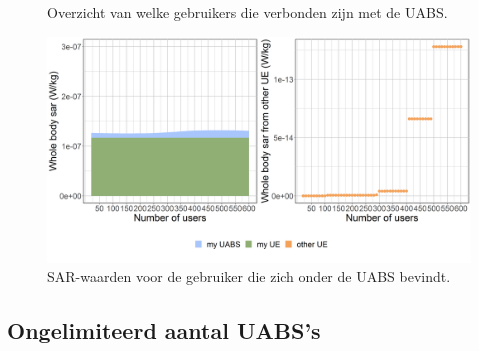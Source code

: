 \documentclass[twocolumn]{phdsymp_dutch}
\begin{document}
\begin{figure}[h]
\hfill
{}
\caption{ Overzicht van welke gebruikers die verbonden zijn met de \acs{UABS}.}
  \label{fig:connectionMap}
\end{figure}

\begin{figure}[h]
\centering
  \includegraphics[width=0.9\linewidth]{../results/s2/uvsulsarcentralUser.png}
  \caption{SAR-waarden voor de gebruiker die zich onder de \acs{UABS} bevindt.}
  \label{fig:uvsulsarcentralUsers}
\end{figure}

\subsection{Ongelimiteerd aantal \gls{UABS}'s}
\end{document}

